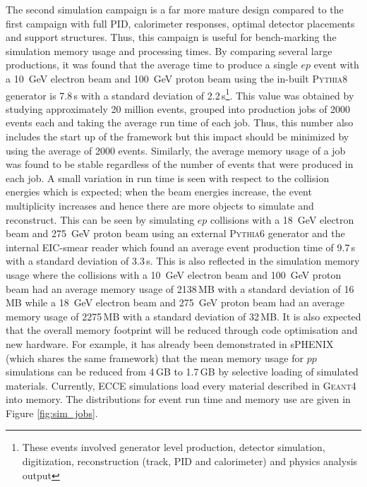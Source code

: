 	The second simulation campaign is a far more mature design compared to the first campaign with full PID, calorimeter responses, optimal detector placements and support structures. Thus, this campaign is useful for bench-marking the simulation memory usage and processing times. By comparing several large productions, it was found that the average time to produce a single $ep$ event with a 10~GeV electron beam and 100~GeV proton beam using the in-built \textsc{Pythia8} generator is 7.8\,s with a standard deviation of 2.2\,s\footnote{These events involved generator level production, detector simulation, digitization, reconstruction (track, PID and calorimeter) and physics analysis output}. This value was obtained by studying approximately 20 million events, grouped into production jobs of 2000 events each and taking the average run time of each job. Thus, this number also includes the start up of the framework but this impact should be minimized by using the average of 2000 events. Similarly, the average memory usage of a job was found to be stable regardless of the number of events that were produced in each job. A small variation in run time is seen with respect to the collision energies which is expected; when the beam energies increase, the event multiplicity increases and hence there are more objects to simulate and reconstruct. This can be seen by simulating $ep$ collisions with a 18~GeV electron beam and 275~GeV proton beam using an external \textsc{Pythia6} generator and the internal EIC-smear reader which found an average event production time of 9.7\,s with a standard deviation of 3.3\,s. This is also reflected in the simulation memory usage where the collisions with a 10~GeV electron beam and 100~GeV proton beam had an average memory usage of 2138\,MB with a standard deviation of 16\,MB while a 18~GeV electron beam and 275~GeV proton beam had an average memory usage of 2275\,MB with a standard deviation of 32\,MB. It is also expected that the overall memory footprint will be reduced through code optimisation and new hardware. For example, it has already been demonstrated in sPHENIX (which shares the same framework) that the mean memory usage for $pp$ simulations can be reduced from 4\,GB to 1.7\,GB by selective loading of simulated materials. Currently, ECCE simulations load every material described in \textsc{Geant4} into memory. The distributions for event run time and memory use are given in Figure \ref{fig:sim_jobs}.


